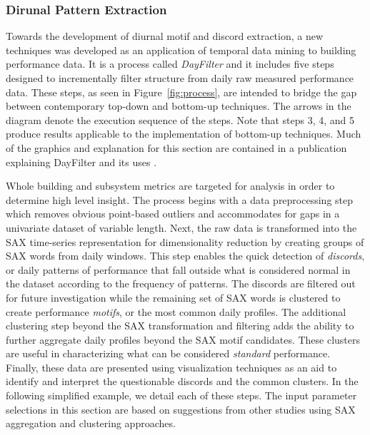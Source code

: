 \subsubsection{Dirunal Pattern Extraction}
\label{sec:dayfilter}

Towards the development of diurnal motif and discord extraction, a new techniques was developed as an application of temporal data mining to building performance data. It is a process called \emph{DayFilter} and it includes five steps designed to incrementally filter structure from daily raw measured performance data. These steps, as seen in Figure~\ref{fig:process}, are intended to bridge the gap between contemporary top-down and bottom-up techniques. The arrows in the diagram denote the execution sequence of the steps. Note that steps 3, 4, and 5 produce results applicable to the implementation of bottom-up techniques. Much of the graphics and explanation for this section are contained in a publication explaining DayFilter and its uses \cite{miller_automated_2015}.

Whole building and subsystem metrics are targeted for analysis in order to determine high level insight. The process begins with a data preprocessing step which removes obvious point-based outliers and accommodates for gaps in a univariate dataset of variable length. Next, the raw data is transformed into the SAX time-series representation for dimensionality reduction by creating groups of SAX words from daily windows. This step enables the quick detection of \emph{discords}, or daily patterns of performance that fall outside what is considered normal in the dataset according to the frequency of patterns. The discords are filtered out for future investigation while the remaining set of SAX words is clustered to create performance \emph{motifs}, or the most common daily profiles. The additional clustering step beyond the SAX transformation and filtering adds the ability to further aggregate daily profiles beyond the SAX motif candidates. These clusters are useful in characterizing what can be considered \emph{standard} performance. Finally, these data are presented using visualization techniques as an aid to identify and interpret the questionable discords and the common clusters. In the following simplified example, we detail each of these steps. The input parameter selections in this section are based on suggestions from other studies using SAX aggregation and clustering approaches. 
